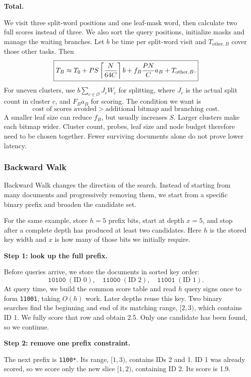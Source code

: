 \textbf{Total.}\par
We visit three split-word positions and one leaf-mask word, then calculate two full scores instead of three. We also sort the query positions, initialize masks and manage the waiting branches. Let $b$ be time per split-word visit and $T_{\mathrm{other},B}$ cover those other tasks. Then
\[
 \boxed{T_B\approx T_0+PS\left\lceil \frac{N}{64C}\right\rceil b
             +f_B\frac{PN}{C}a_B+T_{\mathrm{other},B}.}
\]
For uneven clusters, use $b\sum_{c\in\mathcal O}J_cW_c$ for splitting, where $J_c$ is the actual split count in cluster $c$, and $F_Ba_B$ for scoring. The condition we want is
\[
 \boxed{\text{cost of scores avoided}>\text{additional bitmap and branching cost}.}
\]
A smaller leaf size can reduce $f_B$, but usually increases $S$. Larger clusters make each bitmap wider. Cluster count, probes, leaf size and node budget therefore need to be chosen together. Fewer surviving documents alone do not prove lower latency.

\subsubsection{Backward Walk}
Backward Walk changes the direction of the search. Instead of starting from many documents and progressively removing them, we start from a specific binary prefix and broaden the candidate set.

For the same example, store $h=5$ prefix bits, start at depth $x=5$, and stop after a complete depth has produced at least two candidates. Here $h$ is the stored key width and $x$ is how many of those bits we initially require.

\textbf{Step 1: look up the full prefix.}\par
Before queries arrive, we store the documents in sorted key order:
\[
 \texttt{10100}\;(\text{ID 0}),\quad
 \texttt{11000}\;(\text{ID 2}),\quad
 \texttt{11001}\;(\text{ID 1}).
\]
At query time, we build the common score table and read $h$ query signs once to form \texttt{11001}, taking $O(h)$ work. Later depths reuse this key. Two binary searches find the beginning and end of its matching range, $[2,3)$, which contains ID 1. We fully score that row and obtain 2.5. Only one candidate has been found, so we continue.

\textbf{Step 2: remove one prefix constraint.}\par
The next prefix is \texttt{1100*}. Its range, $[1,3)$, contains IDs 2 and 1. ID 1 was already scored, so we score only the new slice $[1,2)$, containing ID 2. Its score is 1.9.

